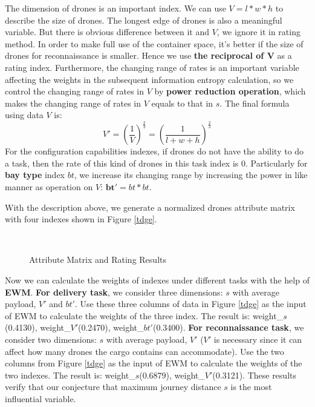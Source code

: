\documentclass{mcmthesis}
\begin{document}
   The dimension of drones is an important index. We can use $V=l*w*h$ to describe the size of drones. The longest edge of drones is also a meaningful variable. But there is obvious difference between it and $V$, we ignore it in rating method. In order to make full use of the container space, it's better if the size of drones for reconnaissance is smaller. Hence we use \textbf{the reciprocal of $\mathbf{V}$} as a rating index. Furthermore, the changing range of rates is an important variable affecting the weights in the subsequent information entropy calculation, so we control the changing range of rates in $V$ by \textbf{power reduction operation}, which makes the changing range of rates in $V$ equals to that in $s$. The final formula using data $V$ is:
   \begin{equation}
   V' = {(\frac{1}{V})^{\frac{2}{3}}} = {(\frac{1}{{l + w + h}})^{\frac{2}{3}}}
   \end{equation}
   For the configuration capabilities indexes, if drones do not have the ability to do a task, then the rate of this kind of drones in this task index is 0. Particularly for \textbf{bay type} index $bt$, we increase its changing range by increasing the power in like manner as operation on $V$: $ \mathbf{bt'}=bt*bt$. \par
   With the description above, we generate a normalized drones attribute matrix with four indexes shown in Figure \ref{tdge}. 
      \begin{figure}[!htbp]                               
   	\centering
   	\qquad
   	\\ 
   	\caption{Attribute Matrix and Rating Results} 
\end{figure}
\par
	Now we can calculate the weights of indexes under different tasks with the help of \textbf{EWM}.  
	\textbf{For delivery task}, we consider three dimensions:  $s$ with average payload, $V'$ and $bt'$. Use these three columns of data in Figure \ref{tdge} as the input of EWM to calculate the weights of the three index. The result is: weight\_$s$(0.4130), weight\_$V'$(0.2470), weight\_$bt'$(0.3400).
	\textbf{For reconnaissance task}, we consider two dimensions: $s$ with average payload, $V'$ ($V'$ is necessary since it can affect how many drones the cargo contains can accommodate). Use the two columns from Figure \ref{tdge} as the input of EWM to calculate the weights of the two indexes. The result is: weight\_$s$(0.6879), weight\_$V'$(0.3121). These results verify that our conjecture that maximum journey distance $s$ is the most influential variable. \par
\end{document}
